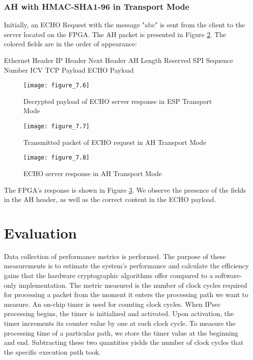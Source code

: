 \subsubsection*{AH with HMAC-SHA1-96 in Transport Mode}
Initially, an ECHO Request with the message "abc" is sent from the client to the server located on the FPGA. The AH packet is presented in Figure \ref{fig:figure_7.7}. The colored fields are in the order of appearance:

\begin{outline}
    \1 Ethernet Header
    \1 IP Header
    \1 Next Header
    \1 AH Length
    \1 Reserved
    \1 SPI
    \1 Sequence Number
    \1 ICV
    \1 TCP Payload
    \1 ECHO Payload    
\end{outline}


\begin{figure}[H]
\centering
\texttt{[image: figure\_7.6]}\\
\caption{ Decrypted payload of ECHO server response in ESP Transport Mode }
\label{fig:figure_7.6}
\end{figure}

\begin{figure}[H]
\centering
\texttt{[image: figure\_7.7]}\\
\caption{ Transmitted packet of ECHO request in AH Transport Mode }
\label{fig:figure_7.7}
\end{figure}

\begin{figure}[H]
\centering
\texttt{[image: figure\_7.8]}\\
\caption{ ECHO server response in AH Transport Mode}
\label{fig:figure_7.8}
\end{figure}

\noindent
The FPGA's response is shown in Figure \ref{fig:figure_7.8}.
We observe the presence of the fields in the AH header, as well as the correct content in the ECHO payload.

\section{Evaluation}
Data collection of performance metrics is performed. The purpose of these measurements is to estimate the system's performance and calculate the efficiency gains that the hardware cryptographic algorithms offer compared to a software-only implementation. The metric measured is the number of clock cycles required for processing a packet from the moment it enters the processing path we want to measure. An on-chip timer is used for counting clock cycles. When IPsec processing begins, the timer is initialized and activated. Upon activation, the timer increments its counter value by one at each clock cycle. To measure the processing time of a particular path, we store the timer value at the beginning and end. Subtracting these two quantities yields the number of clock cycles that the specific execution path took.

